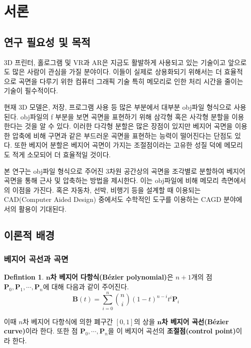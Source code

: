 \documentclass[10pt]{gshs-report-v2.0}
\theoremstyle{theorem}
\theoremstyle{lemma}
\theoremstyle{definition}
\newtheorem{definition}[theorem]{Defintion}
\begin{document}
\pagebreak

\tableofcontents
\pagebreak
\listoffigures
\pagebreak

\setcounter{page}{1}


\section{서론}

\subsection{연구 필요성 및 목적}
3D 프린터, 홀로그램 및 VR과 AR은 지금도 활발하게 사용되고 있는 기술이고 앞으로도 많은 사람이 관심을 가질 분야이다. 이들이 실제로 상용화되기 위해서는 더 효율적으로 곡면을 다루기 위한 컴퓨터 그래픽 기술 특히 메모리로 인한 처리 시간을 줄이는 기술이 필수적이다. 

현재 3D 모델은, 저장, 프로그램 사용 등 많은 부분에서 대부분 obj파일 형식으로 사용된다. obj파일의 f 부분을 보면 곡면을 표현하기 위해 삼각형 혹은 사각형 분할을 이용한다는 것을 알 수 있다. 이러한 다각형 분할은 많은 장점이 있지만 베지어 곡면을 이용한 압축에 비해 구면과 같은 부드러운 곡면을 표현하는 능력이 떨어진다는 단점도 있다. 또한 베지어 분할은 베지어 곡면이 가지는 조절점이라는 고유한 성질 덕에 메모리도 적게 소모되어 더 효율적일 것이다. 

본 연구는 obj파일 형식으로 주어진 3차원 공간상의 곡면을 조각별로 분할하여 베지어 곡면을 통해 근사 및 압축하는 방법을 제시한다. 이는 obj파일에 비해 메모리 측면에서의 이점을 가진다. 혹은 자동차, 선박, 비행기 등을 설계할 때 이용되는 CAD(Computer Aided Design) 중에서도 수학적인 도구를 이용하는 CAGD 분야에서의 활용이 기대된다. 

\subsection{이론적 배경}
\subsubsection{베지어 곡선과 곡면}
\begin{definition} \label{BC}
	\textbf{$\boldsymbol{n}$차 베지어 다항식(Bézier polynomial)}은 $n+1$개의 점 $\mathbf{P}_0, \mathbf{P}_1, \cdots, \mathbf{P}_n$에 대해 다음과 같이 주어진다.
	\begin{equation}
		\mathbf{B}(t)=\sum_{i=0}^n \binom ni(1-t)^{n-i}t^i\mathbf{P}_i
	\end{equation}

	이때 $n$차 베지어 다항식에 의한 폐구간 $[0, 1]$의 상을 \textbf{$\boldsymbol{n}$차 베지어 곡선(Bézier curve)}이라 한다. 또한 점 $\mathbf{P}_0, \cdots, \mathbf{P}_n$을 이 베지어 곡선의 \textbf{조절점(control point)}이라 한다. 
\end{definition}
\end{document}
